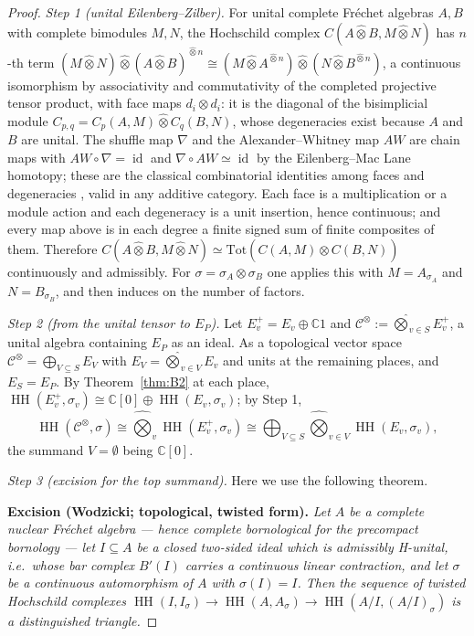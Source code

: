\documentclass[11pt]{amsart}
\theoremstyle{definition}
\theoremstyle{remark}
\newcommand{\C}{\mathbb C}
\newcommand{\id}{\operatorname{id}}
\newcommand{\HH}{\operatorname{HH}}
\begin{document}
\begin{proof}
\emph{Step 1 (unital Eilenberg--Zilber).}  For unital complete Fr\'echet
algebras $A,B$ with complete bimodules $M,N$, the Hochschild complex
$C(A\widehat\otimes B,M\widehat\otimes N)$ has $n$-th term
$(M\widehat\otimes N)\widehat\otimes(A\widehat\otimes B)^{\widehat\otimes n}
\cong(M\widehat\otimes A^{\widehat\otimes n})\widehat\otimes
(N\widehat\otimes B^{\widehat\otimes n})$, a continuous isomorphism by
associativity and commutativity of the completed projective tensor product,
with face maps $d_i\otimes d_i$: it is the diagonal of the bisimplicial module
$C_{p,q}=C_p(A,M)\widehat\otimes C_q(B,N)$, whose degeneracies exist because
$A$ and $B$ are unital.  The shuffle map $\nabla$ and the Alexander--Whitney
map $AW$ are chain maps with $AW\circ\nabla=\id$ and $\nabla\circ AW\simeq\id$
by the Eilenberg--Mac Lane homotopy; these are the classical combinatorial
identities among faces and degeneracies \cite[VIII.8]{MacLane}, valid in any
additive category.  Each face is a multiplication or a module action and each
degeneracy is a unit insertion, hence continuous; and every map above is in
each degree a finite signed sum of finite composites of them.  Therefore
$C(A\widehat\otimes B,M\widehat\otimes N)\simeq
\mathrm{Tot}(C(A,M)\widehat\otimes C(B,N))$ continuously and admissibly.  For
$\sigma=\sigma_A\otimes\sigma_B$ one applies this with $M=A_{\sigma_A}$ and
$N=B_{\sigma_B}$, and then induces on the number of factors.

\emph{Step 2 (from the unital tensor to $E_P$).}  Let $E_v^{+}=E_v\oplus\C1$
and $\mathcal C^{\otimes}:=\widehat\bigotimes_{v\in S}E_v^{+}$, a unital
algebra containing $E_P$ as an ideal.  As a topological vector space
$\mathcal C^{\otimes}=\bigoplus_{V\subseteq S}E_V$ with
$E_V=\widehat\bigotimes_{v\in V}E_v$ and units at the remaining places, and
$E_S=E_P$.  By Theorem~\ref{thm:B2} at each place,
$\HH(E_v^{+},\sigma_v)\cong\C[0]\oplus\HH(E_v,\sigma_v)$; by Step 1,
\[
\HH(\mathcal C^{\otimes},\sigma)\cong
\widehat\bigotimes_{v}\HH(E_v^{+},\sigma_v)\cong
\bigoplus_{V\subseteq S}\widehat\bigotimes_{v\in V}\HH(E_v,\sigma_v),
\]
the summand $V=\emptyset$ being $\C[0]$.

\emph{Step 3 (excision for the top summand).}  Here we use the following
theorem.

\smallskip
\noindent\textbf{Excision (Wodzicki; topological, twisted form).}
\emph{Let $A$ be a complete nuclear Fr\'echet algebra --- hence complete
bornological for the precompact bornology --- let $I\subseteq A$ be a closed
two-sided ideal which is admissibly H-unital, i.e.\ whose bar complex $B'(I)$
carries a continuous linear contraction, and let $\sigma$ be a continuous
automorphism of $A$ with $\sigma(I)=I$.  Then the sequence of twisted
Hochschild complexes
$\HH(I,I_{\sigma})\to\HH(A,A_{\sigma})\to\HH(A/I,(A/I)_{\sigma})$
is a distinguished triangle.}
\smallskip


\end{proof}
\end{document}
